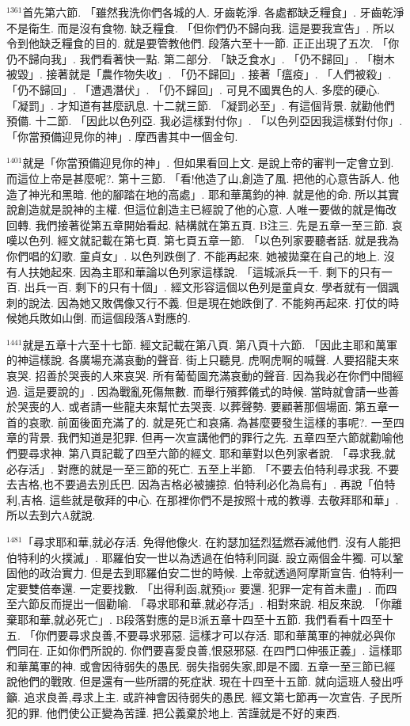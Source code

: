 \documentclass{book}
\begin{document}
$^{1361}$首先第六節.
「雖然我洗你們各城的人.
牙齒乾淨.
各處都缺乏糧食」.
牙齒乾淨不是衛生.
而是沒有食物.
缺乏糧食.
「但你們仍不歸向我.
這是要我宣告」.
所以令到他缺乏糧食的目的.
就是要管教他們.
段落六至十一節.
正正出現了五次.
「你仍不歸向我」.
我們看著快一點.
第二部分.
「缺乏食水」.
「仍不歸回」.
「樹木被毀」.
接著就是「農作物失收」.
「仍不歸回」.
接著「瘟疫」.
「人們被殺」.
「仍不歸回」.
「遭遇潛伏」.
「仍不歸回」.
可見不國異色的人.
多麼的硬心.
「凝罰」.
才知道有甚麼訊息.
十二就三節.
「凝罰必至」.
有這個背景.
就勸他們預備.
十二節.
「因此以色列亞.
我必這樣對付你」.
「以色列亞因我這樣對付你」.
「你當預備迎見你的神」.
摩西書其中一個金句.

$^{1401}$就是「你當預備迎見你的神」.
但如果看回上文.
是說上帝的審判一定會立到.
而這位上帝是甚麼呢?.
第十三節.
「看!他造了山,創造了風.
把他的心意告訴人.
他造了神光和黑暗.
他的腳踏在地的高處」.
耶和華萬鈞的神.
就是他的命.
所以其實說創造就是說神的主權.
但這位創造主已經說了他的心意.
人唯一要做的就是悔改回轉.
我們接著從第五章開始看起.
結構就在第五頁.
B注三.
先是五章一至三節.
哀嘆以色列.
經文就記載在第七頁.
第七頁五章一節.
「以色列家要聽者話.
就是我為你們唱的幻歌.
童貞女」.
以色列跌倒了.
不能再起來.
她被拋棄在自己的地上.
沒有人扶她起來.
因為主耶和華論以色列家這樣說.
「這城派兵一千.
剩下的只有一百.
出兵一百.
剩下的只有十個」.
經文形容這個以色列是童貞女.
學者就有一個諷刺的說法.
因為她又敗偶像又行不義.
但是現在她跌倒了.
不能夠再起來.
打仗的時候她兵敗如山倒.
而這個段落A對應的.

$^{1441}$就是五章十六至十七節.
經文記載在第八頁.
第八頁十六節.
「因此主耶和萬軍的神這樣說.
各廣場充滿哀動的聲音.
街上只聽見.
虎啊虎啊的喊聲.
人要招龍夫來哀哭.
招善於哭喪的人來哀哭.
所有葡萄園充滿哀動的聲音.
因為我必在你們中間經過.
這是要說的」.
因為戰亂死傷無數.
而舉行殯葬儀式的時候.
當時就會請一些善於哭喪的人.
或者請一些龍夫來幫忙去哭喪.
以葬聲勢.
要顧著那個場面.
第五章一首的哀歌.
前面後面充滿了的.
就是死亡和哀痛.
為甚麼要發生這樣的事呢?.
一至四章的背景.
我們知道是犯罪.
但再一次宣講他們的罪行之先.
五章四至六節就勸喻他們要尋求神.
第八頁記載了四至六節的經文.
耶和華對以色列家者說.
「尋求我,就必存活」.
對應的就是一至三節的死亡.
五至上半節.
「不要去伯特利尋求我.
不要去吉格,也不要過去別氏巴.
因為吉格必被擄掠.
伯特利必化為烏有」.
再說「伯特利,吉格.
這些就是敬拜的中心.
在那裡你們不是按照十戒的教導.
去敬拜耶和華」.
所以去到六A就說.

$^{1481}$「尋求耶和華,就必存活.
免得他像火.
在約瑟加猛烈猛燃吞滅他們.
沒有人能把伯特利的火撲滅」.
耶羅伯安一世以為透過在伯特利同誕.
設立兩個金牛獨.
可以鞏固他的政治實力.
但是去到耶羅伯安二世的時候.
上帝就透過阿摩斯宣告.
伯特利一定要雙倍奉還.
一定要找數.
「出得利函,就預jor 要還.
犯罪一定有首未盡」.
而四至六節反而提出一個勸喻.
「尋求耶和華,就必存活」.
相對來說.
相反來說.
「你離棄耶和華,就必死亡」.
B段落對應的是B派五章十四至十五節.
我們看看十四至十五.
「你們要尋求良善,不要尋求邪惡.
這樣才可以存活.
耶和華萬軍的神就必與你們同在.
正如你們所說的.
你們要喜愛良善,恨惡邪惡.
在四門口伸張正義」.
這樣耶和華萬軍的神.
或會因待弱失的愚民.
弱失指弱失家,即是不國.
五章一至三節已經說他們的戰敗.
但是還有一些所謂的死症狀.
現在十四至十五節.
就向這班人發出呼籲.
追求良善,尋求上主.
或許神會因待弱失的愚民.
經文第七節再一次宣告.
子民所犯的罪.
他們使公正變為苦謹.
把公義棄於地上.
苦謹就是不好的東西.
\end{document}
